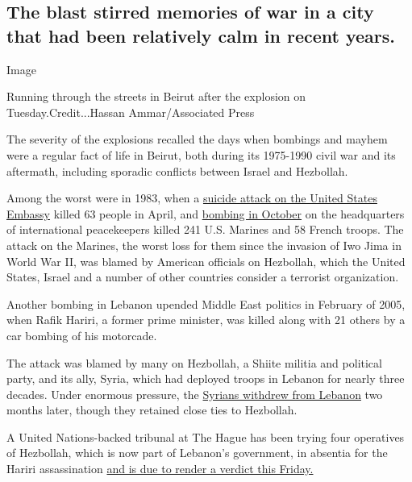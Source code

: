 \hypertarget{the-blast-stirred-memories-of-war-in-a-city-that-had-been-relatively-calm-in-recent-years}{%
\subsection{The blast stirred memories of war in a city that had been
relatively calm in recent
years.}\label{the-blast-stirred-memories-of-war-in-a-city-that-had-been-relatively-calm-in-recent-years}}

Image

Running through the streets in Beirut after the explosion on
Tuesday.Credit...Hassan Ammar/Associated Press

The severity of the explosions recalled the days when bombings and
mayhem were a regular fact of life in Beirut, both during its 1975-1990
civil war and its aftermath, including sporadic conflicts between Israel
and Hezbollah.

Among the worst were in 1983, when a
\href{https://www.history.com/this-day-in-history/suicide-bomber-destroys-u-s-embassy-in-beirut}{suicide
attack on the United States Embassy} killed 63 people in April, and
\href{https://www.history.com/this-day-in-history/beirut-barracks-blown-up}{bombing
in October} on the headquarters of international peacekeepers killed 241
U.S. Marines and 58 French troops. The attack on the Marines, the worst
loss for them since the invasion of Iwo Jima in World War II, was blamed
by American officials on Hezbollah, which the United States, Israel and
a number of other countries consider a terrorist organization.

Another bombing in Lebanon upended Middle East politics in February of
2005, when Rafik Hariri, a former prime minister, was killed along with
21 others by a car bombing of his motorcade.

The attack was blamed by many on Hezbollah, a Shiite militia and
political party, and its ally, Syria, which had deployed troops in
Lebanon for nearly three decades. Under enormous pressure, the
\href{https://www.nytimes.com/2005/04/26/international/middleeast/syrian-troops-leave-lebanon-after-29year-occupation.html}{Syrians
withdrew from Lebanon} two months later, though they retained close ties
to Hezbollah.

A United Nations-backed tribunal at The Hague has been trying four
operatives of Hezbollah, which is now part of Lebanon's government, in
absentia for the Hariri assassination
\href{https://www.reuters.com/article/us-lebanon-tribunal-hariri/crisis-weary-lebanon-braces-for-hariri-tribunal-verdict-idUSKCN2500JU}{and
is due to render a verdict this Friday.}

